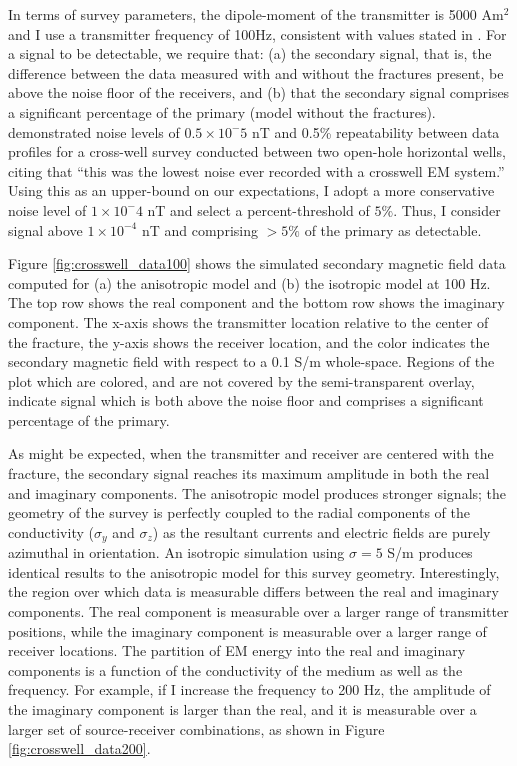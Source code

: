 In terms of survey parameters, the dipole-moment of the transmitter is 5000 Am$^2$ and I use a transmitter frequency of 100Hz, consistent with values stated in \cite{Wilt1995, Wilt2003}. For a signal to be detectable, we require that: (a) the secondary signal, that is, the difference between the data measured with and without the fractures present, be above the noise floor of the receivers, and (b) that the secondary signal comprises a significant percentage of the primary (model without the fractures). \cite{Marsala2015a} demonstrated noise levels of $0.5 \times 10^-5$ nT and 0.5\% repeatability between data profiles for a cross-well survey conducted between two open-hole horizontal wells, citing that ``this was the lowest noise ever recorded with a crosswell EM system.'' Using this as an upper-bound on our expectations, I adopt a more conservative noise level of $1\times10^-4$ nT and select a percent-threshold of $5\%$. Thus, I consider signal above $1\times10^{-4}$ nT and comprising $>5\%$ of the primary as detectable.

Figure \ref{fig:crosswell_data100} shows the simulated secondary magnetic field data computed for (a) the anisotropic model and (b) the isotropic model at 100 Hz. The top row shows the real component and the bottom row shows the imaginary component. The x-axis shows the transmitter location relative to the center of the fracture, the y-axis shows the receiver location, and the color indicates the secondary magnetic field with respect to a 0.1 S/m whole-space. Regions of the plot which are colored, and are not covered by the semi-transparent overlay, indicate signal which is both above the noise floor and comprises a significant percentage of the primary.




As might be expected, when the transmitter and receiver are centered with the fracture, the secondary signal reaches its maximum amplitude in both the real and imaginary components. The anisotropic model produces stronger signals; the geometry of the survey is perfectly coupled to the radial components of the conductivity ($\sigma_y$ and $\sigma_z$) as the resultant currents and electric fields are purely azimuthal in orientation. An isotropic simulation using $\sigma = 5$ S/m produces identical results to the anisotropic model for this survey geometry. Interestingly, the region over which data is measurable differs between the real and imaginary components. The real component is measurable over a larger range of transmitter positions, while the imaginary component is measurable over a larger range of receiver locations. The partition of EM energy into the real and imaginary components is a function of the conductivity of the medium as well as the frequency. For example, if I increase the frequency to 200 Hz, the amplitude of the imaginary component is larger than the real, and it is measurable over a larger set of source-receiver combinations, as shown in Figure \ref{fig:crosswell_data200}.

